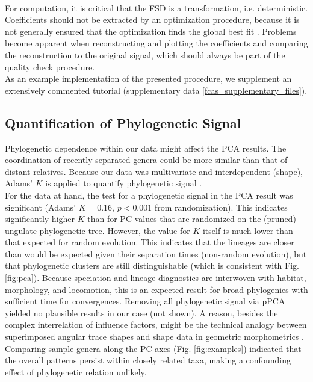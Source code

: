 \bigskip\\For computation, it is critical that the FSD is a transformation, i.e. deterministic.
Coefficients should not be extracted by an optimization procedure, because it is not generally ensured that the optimization finds the global best fit \citep{Hubel2015,Basu2019}.
Problems become apparent when reconstructing and plotting the coefficients and comparing the reconstruction to the original signal, which should always be part of the quality check procedure.
\\ As an example implementation of the presented procedure, we supplement an extensively commented tutorial (supplementary data \ref{fcas_supplementary_files}).


\subsection{Quantification of Phylogenetic Signal}\label{apdx:phylosig}
Phylogenetic dependence within our data might affect the PCA results.
The coordination of recently separated genera could be more similar than that of distant relatives.
Because our data was multivariate and interdependent (shape), Adams' $K$ is applied to quantify phylogenetic signal \citep{Adams2014}.
\\For the data at hand, the test for a phylogenetic signal in the PCA result was significant (Adams' $K=0.16$, $p < 0.001$ from randomization).
This indicates significantly higher $K$ than for PC values that are randomized on the (pruned) ungulate phylogenetic tree.
However, the value for $K$ itself is much lower than that expected for random evolution.
This indicates that the lineages are closer than would be expected given their separation times (non-random evolution), but that phylogenetic clusters are still distinguishable (which is consistent with Fig. \ref{fig:pca}).
Because speciation and lineage diagnostics are interwoven with habitat, morphology, and locomotion, this is an expected result for broad phylogenies with sufficient time for convergences.
Removing all phylogenetic signal via pPCA \citep{Revell2009} yielded no plausible results in our case (not shown).
A reason, besides the complex interrelation of influence factors, might be the technical analogy between superimposed angular trace shapes and shape data in geometric morphometrics \citep[\textit{cf.}][]{Polly2013}.
Comparing sample genera along the PC axes (Fig. \ref*{fig:examples}) indicated that the overall patterns persist within closely related taxa, making a confounding effect of phylogenetic relation unlikely.



